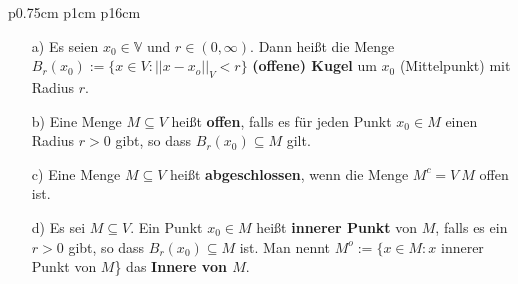 \begin{longtable}{p{0.75cm} p{1cm} p{16cm}}
\begin{minipage}{\linewidth}
\begin{itemize}
                                \item[a)] Es seien $x_0 \in \mathbb{V}$ und $r \in (0, \infty)$. Dann heißt die Menge \hfill \break
                                            $B_r(x_0) := \{x \in V: ||x-x_o||_V < r\} $ \textbf{(offene) Kugel} um $x_0$ (Mittelpunkt) mit Radius $r$.
                                \item[b)] Eine Menge $M \subseteq V$ heißt \textbf{offen}, falls es für jeden Punkt $x_0 \in M$ einen Radius
                                            $r > 0$ gibt, so dass $B_r(x_0) \subseteq M$ gilt.
                                \item[c)] Eine Menge $M \subseteq V$ heißt \textbf{abgeschlossen}, wenn die Menge $M^c = V \ M$ offen ist.
                                \item[d)] Es sei $M \subseteq V$. Ein Punkt $x_0 \in M$ heißt \textbf{innerer Punkt} von $M$, falls es ein
                                            $r > 0$ gibt, so dass $B_r(x_0) \subseteq M$ ist. \hfill \break 
                                            Man nennt $M^o := \{x \in M: x$ innerer Punkt von $M$\} das \textbf{Innere von $M$}.    
                            

\end{itemize}
\end{minipage}
\end{longtable}
